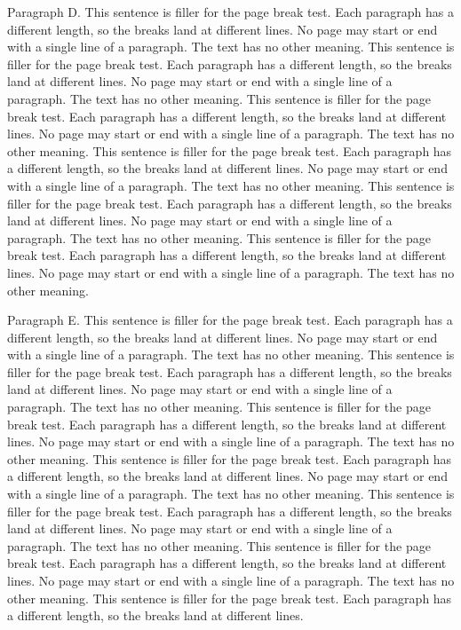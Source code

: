 Paragraph D. This sentence is filler for the page break test. Each paragraph
has a different length, so the breaks land at different lines. No page may
start or end with a single line of a paragraph. The text has no other meaning.
This sentence is filler for the page break test. Each paragraph has a
different length, so the breaks land at different lines. No page may start or
end with a single line of a paragraph. The text has no other meaning. This
sentence is filler for the page break test. Each paragraph has a different
length, so the breaks land at different lines. No page may start or end with a
single line of a paragraph. The text has no other meaning. This sentence is
filler for the page break test. Each paragraph has a different length, so the
breaks land at different lines. No page may start or end with a single line of
a paragraph. The text has no other meaning. This sentence is filler for the
page break test. Each paragraph has a different length, so the breaks land at
different lines. No page may start or end with a single line of a paragraph.
The text has no other meaning. This sentence is filler for the page break
test. Each paragraph has a different length, so the breaks land at different
lines. No page may start or end with a single line of a paragraph. The text
has no other meaning.

Paragraph E. This sentence is filler for the page break test. Each paragraph
has a different length, so the breaks land at different lines. No page may
start or end with a single line of a paragraph. The text has no other meaning.
This sentence is filler for the page break test. Each paragraph has a
different length, so the breaks land at different lines. No page may start or
end with a single line of a paragraph. The text has no other meaning. This
sentence is filler for the page break test. Each paragraph has a different
length, so the breaks land at different lines. No page may start or end with a
single line of a paragraph. The text has no other meaning. This sentence is
filler for the page break test. Each paragraph has a different length, so the
breaks land at different lines. No page may start or end with a single line of
a paragraph. The text has no other meaning. This sentence is filler for the
page break test. Each paragraph has a different length, so the breaks land at
different lines. No page may start or end with a single line of a paragraph.
The text has no other meaning. This sentence is filler for the page break
test. Each paragraph has a different length, so the breaks land at different
lines. No page may start or end with a single line of a paragraph. The text
has no other meaning. This sentence is filler for the page break test. Each
paragraph has a different length, so the breaks land at different lines.

